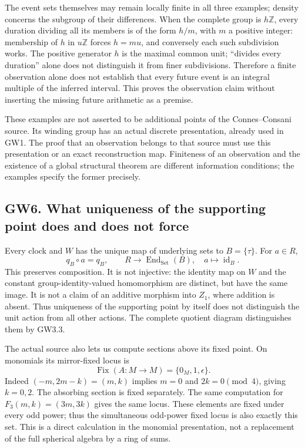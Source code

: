 The event sets themselves may remain locally finite in all three
examples; density concerns the subgroup of their differences. When the
complete group is \(h\mathbb Z\), every duration dividing all its
members is of the form \(h/m\), with \(m\) a positive integer:
membership of \(h\) in \(u\mathbb Z\) forces \(h=mu\), and conversely
each such subdivision works. The positive generator \(h\) is the maximal
common unit; ``divides every duration'' alone does not distinguish it
from finer subdivisions. Therefore a finite observation alone does not
establish that every future event is an integral multiple of the
inferred interval. This proves the observation claim without inserting
the missing future arithmetic as a premise.

These examples are not asserted to be additional points of the
Connes--Consani source. Its winding group has an actual discrete
presentation, already used in GW1. The proof that an observation belongs
to that source must use this presentation or an exact reconstruction
map. Finiteness of an observation and the existence of a global
structural theorem are different information conditions; the examples
specify the former precisely.

\subsection{GW6. What uniqueness of the supporting point does and does
not
force}\label{gw20260924-gw6.-what-uniqueness-of-the-supporting-point-does-and-does-not-force}

Every clock and \(W\) has the unique map of underlying sets to
\(B=\{\tau\}\). For \(a\in R\), \[
q_B\circ a=q_B,
\qquad
R\longrightarrow\operatorname{End}_{\mathrm{Set}}(B),
\quad a\longmapsto\operatorname{id}_B.
\tag{GW6.1}
\] This preserves composition. It is not injective: the identity map on
\(W\) and the constant group-identity-valued homomorphism are distinct,
but have the same image. It is not a claim of an additive morphism into
\(Z_1\), where addition is absent. Thus uniqueness of the supporting
point by itself does not distinguish the unit action from all other
actions. The complete quotient diagram distinguishes them by GW3.3.

The actual source also lets us compute sections above its fixed point.
On monomials its mirror-fixed locus is \[
\operatorname{Fix}(A:M\to M)=\{0_M,1,\epsilon\}.
\tag{GW6.2}
\] Indeed \((-m,2m-k)=(m,k)\) implies \(m=0\) and \(2k=0\pmod4\), giving
\(k=0,2\). The absorbing section is fixed separately. The same
computation for \(F_3(m,k)=(3m,3k)\) gives the same locus. These
elements are fixed under every odd power; thus the simultaneous
odd-power fixed locus is also exactly this set. This is a direct
calculation in the monomial presentation, not a replacement of the full
spherical algebra by a ring of sums.

